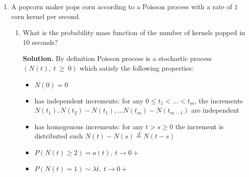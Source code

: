 \documentclass[a4paper, 12pt]{article}
\newcommand{\task}[2]{
    \item #1

    \textbf{Solution. } #2
}
\begin{document}
\begin{enumerate}
\begin{enumerate}
{              }
              {
              Let's calculate a probability using PDF (1 hour is equal to 3600 seconds):
              \[
                  P(t > 3600) = \int\limits_{3600}^{\infty} \lambda e^{-\lambda x} dx =
                  -e^{-\lambda x} \big|_{3600}^{\infty} = e^{-3600 \lambda}.
              \]
              }
              \task{What is the probability that the alarm clock rings for the Ist time after the 2nd hour?}
              {
              Let's calculate a probability using PDF (2 hour is equal to 7200 seconds):
              \[
                  P(t > 7200) = \int\limits_{7200}^{\infty} \lambda e^{-\lambda x} dx =
                  -e^{-\lambda x} \big|_{7200}^{\infty} = e^{-7200 \lambda}.
              \]
              }
              \task{If you knew that the alarm clock will not ring within the 1st hour, what is the probability
                  that it will ring for the lst time after the 2nd hour?}
              {
                  We calculate it using a definition of conditional probability:
                  \[
                      P(t > 7200 | t > 3600) = \frac{P(t > 7200 \cap t > 3600)}{P(t > 3600)}
                  \]
                  But, let's see that $\{t > 7200 \}$ is only a subset of event $\{ t > 3600 \}$ so,
                  joint probability is equal to probability of a subset, so:
                  \[
                      P(t > 7200 | t > 3600) = \frac{P(t > 7200)}{P(t > 3600)} = \frac{e^{-7200 \lambda}}{e^{-3600 \lambda}} = e^{-3600 \lambda} = P(t > 3600)
                  \]
              }
          \end{enumerate}
    \item A popcorn maker pops corn according to a Poisson process with a rate of $1$ corn kernel per
          second.
          \begin{enumerate}
              \task{What is the probability mass function of the number of kernels popped in 10 seconds?}
              {
                  By definition Poisson process is a stochastic process $(N(t),~t~\geq~0)$ which
                  satisfy the following properties:
                  \begin{itemize}
                      \item $N(0) = 0$
                      \item has independent increments: for any $0 \leq t_1 < \dots < t_m$, the increments
                            $N(t_1), N(t_2) - N(t_1), \dots N(t_m) - N(t_{m-1}) $ are independent
                      \item has homogenous increments: for any $t > s \geq 0$ the increment is
                            distributed such $N(t) - N(s) \stackrel{d}{=} N(t-s)$
                      \item $P(N(t) \geq 2) = o(t),\ t\rightarrow 0+$
                      \item $P(N(t) = 1) \sim \lambda t,\ t\rightarrow 0+$
                  \end{itemize}

}
\end{enumerate}
\end{enumerate}
\end{document}
